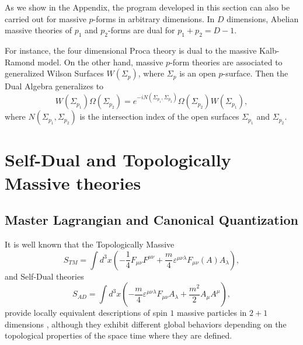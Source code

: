 \documentclass[a4paper,12pt]{article}
\newcommand{\emn}{\varepsilon^{\mu\nu\lambda}}
\begin{document}
As we show in the Appendix, the program developed in this section can also be carried out for 
massive $p$-forms in
  arbitrary dimensions. In $D$ dimensions, Abelian massive theories of $p_1$ and $p_2$-forms are 
dual for $p_1 + p_2 = D-1$.

For instance, the four dimensional Proca theory is dual to the massive Kalb-Ramond model. On the other hand, massive $p$-form theories are associated to generalized Wilson Surfaces $W(\Sigma_p)$, where $\Sigma_p$ is 
an open $p$-surface. Then the Dual Algebra generalizes to
\begin{equation}
W(\Sigma_{p_1})\Omega(\Sigma_{p_2})=e^{-iN(\Sigma_{p_1},\Sigma_{p_2})}\Omega(\Sigma_{p_2})W(\Sigma_{p_1}),
\end{equation}
  where $N(\Sigma_{p_1},\Sigma_{p_2})$ is the intersection index of the open surfaces $\Sigma_{p_1}$ 
and $\Sigma_{p_2}$.

\section{Self-Dual and Topologically Massive theories}\label{sec4}
\subsection{Master Lagrangian and Canonical Quantization}
It is well known that the Topologically Massive \cite{DJT}
\begin{equation}
   \label{eq-1.1}
   S_{TM}=\int d^3x\left(-\frac 14F_{\mu\nu}F^{\mu\nu}+
\frac m{4}\emn F_{\mu\nu}(A)A_\lambda\right),
\end{equation}
and Self-Dual theories \cite{TPN}
\begin{equation}
\label{eq:1.2}
S_{AD}=\int d^3x\left(-\frac m{4}\emn F_{\mu\nu}A_\lambda+
\frac{m^2}2A_\mu A^\mu\right),
\end{equation}
provide locally equivalent descriptions of spin $1$ massive particles in
$2+1$ dimensions \cite{DJ}, although they exhibit different global behaviors
depending on the topological properties of the space time where they are
defined\cite{PR,ST}.
\end{document}
